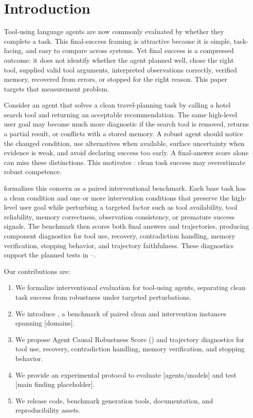 \section{Introduction}

Tool-using language agents are now commonly evaluated by whether they complete a task. This final-success framing is attractive because it is simple, task-facing, and easy to compare across systems. Yet final success is a compressed outcome: it does not identify whether the agent planned well, chose the right tool, supplied valid tool arguments, interpreted observations correctly, verified memory, recovered from errors, or stopped for the right reason. This paper targets that measurement problem.

Consider an agent that solves a clean travel-planning task by calling a hotel search tool and returning an acceptable recommendation. The same high-level user goal may become much more diagnostic if the search tool is removed, returns a partial result, or conflicts with a stored memory. A robust agent should notice the changed condition, use alternatives when available, surface uncertainty when evidence is weak, and avoid declaring success too early. A final-answer score alone can miss these distinctions. This motivates : clean task success may overestimate robust competence.

\benchmark formalizes this concern as a paired interventional benchmark. Each base task has a clean condition and one or more intervention conditions that preserve the high-level user goal while perturbing a targeted factor such as tool availability, tool reliability, memory correctness, observation consistency, or premature success signals. The benchmark then scores both final answers and trajectories, producing component diagnostics for tool use, recovery, contradiction handling, memory verification, stopping behavior, and trajectory faithfulness. These diagnostics support the planned tests in --.

Our contributions are:
\begin{enumerate}[leftmargin=*]
    \item We formalize interventional evaluation for tool-using agents, separating clean task success from robustness under targeted perturbations.
    \item We introduce \benchmark, a benchmark of paired clean and intervention instances spanning [domains].
    \item We propose Agent Causal Robustness Score (\acrs) and trajectory diagnostics for tool use, recovery, contradiction handling, memory verification, and stopping behavior.
    \item We provide an experimental protocol to evaluate [agents/models] and test [main finding placeholder].
    \item We release code, benchmark generation tools, documentation, and reproducibility assets.
\end{enumerate}

